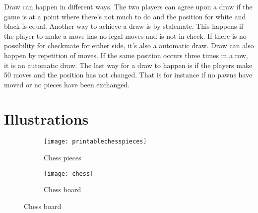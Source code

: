 \documentclass{article}
\begin{document}
\begin{description}[align=right]
\item [Draw:] \hspace{6mm} Draw can happen in different ways. The two players can agree upon a draw if the game is at a point where there's not much to do and the position for white and black is equal. Another way to achieve a draw is by stalemate. This happens if the player to make a move has no legal moves and is not in check. If there is no possibility for checkmate for either side, it's also a automatic draw. Draw can also happen by repetition of moves. If the same position occurs three times in a row, it is an automatic draw. The last way for a draw to happen is if the players make 50 moves and the position has not changed. That is for instance if no pawns have moved or no pieces have been exchanged.
\end{description}

\section{Illustrations}
\begin{figure} [h!]
	\begin{subfigure}[b]{0.5\textwidth}
		\texttt{[image: printablechesspieces]}
        \caption{Chess pieces}
        \label{fig:printablechesspieces}
	\end{subfigure}
    \begin{subfigure}[b]{0.5\textwidth}
		\texttt{[image: chess]}
        \caption{Chess board}
        \label{fig:chess}
	\end{subfigure}

\end{figure}
\end{document}
